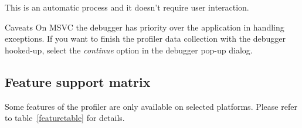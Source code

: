 \documentclass[hidelinks,titlepage,a4paper]{article}
\begin{document}
This is an automatic process and it doesn't require user interaction.

\begin{bclogo}[
noborder=true,
couleur=black!5,
logo=\bcattention
]{Caveats}
On MSVC the debugger has priority over the application in handling exceptions. If you want to finish the profiler data collection with the debugger hooked-up, select the \emph{continue} option in the debugger pop-up dialog.
\end{bclogo}

\subsection{Feature support matrix}
\label{featurematrix}

Some features of the profiler are only available on selected platforms. Please refer to table~\ref{featuretable} for details.
\end{document}
